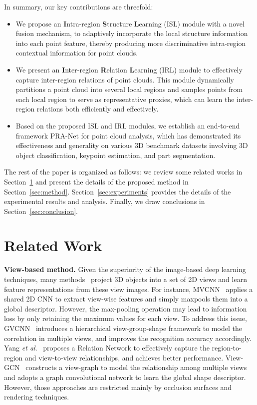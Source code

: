 \documentclass[journal]{IEEEtran}
\def\etal{\emph{et al}.}
\begin{document}
In summary, our key contributions are threefold:
\begin{itemize}
 \item We propose an \textbf{I}ntra-region \textbf{S}tructure \textbf{L}earning (ISL) module with a novel fusion mechanism, to adaptively incorporate the local structure information into each point feature, thereby producing more discriminative intra-region contextual information for point clouds.
 \item We present an \textbf{I}nter-region \textbf{R}elation \textbf{L}earning (IRL) module to effectively capture inter-region relations of point clouds. This module dynamically partitions a point cloud into several local regions and samples points from each local region to serve as representative proxies, which can learn the inter-region relations both efficiently and effectively. 
 \item Based on the proposed ISL and IRL modules, we establish an end-to-end framework PRA-Net for point cloud analysis, which has demonstrated its effectiveness and generality on various 3D benchmark datasets involving 3D object classification, keypoint estimation, and part segmentation.
\end{itemize}

The rest of the paper is organized as follows: we review some related works in Section~\ref{sec:related_work} and present the details of the proposed method in Section~\ref{sec:method}. Section~\ref{sec:experiments} provides the details of the experimental results and analysis. Finally, we draw conclusions in Section~\ref{sec:conclusion}.

\section{Related Work} \label{sec:related_work}
\textbf{View-based method.} Given the superiority of the image-based deep learning techniques, many methods~\cite{su2015multi,bai2016gift,han2018seqviews2seqlabels,han20193d2seqviews,he2019view, feng2018gvcnn, wei2020view} project 3D objects into a set of 2D views and learn feature representations from these view images. For instance, MVCNN~\cite{su2015multi} applies a shared 2D CNN to extract view-wise features and simply maxpools
them into a global descriptor. However, the max-pooling operation may lead to information loss by only retaining the maximum values for each view. To address this issue, GVCNN~\cite{feng2018gvcnn} introduces a hierarchical view-group-shape framework to model the correlation in multiple views, and improves the recognition accuracy accordingly. Yang \etal~\cite{yang2019learning} proposes a Relation Network to effectively capture the region-to-region and view-to-view relationships, and achieves better performance. View-GCN~\cite{wei2020view} constructs a view-graph to model the relationship among multiple views and adopts a graph convolutional network to learn the global shape descriptor. However, those approaches are restricted mainly by occlusion surfaces and rendering techniques. 
\end{document}
